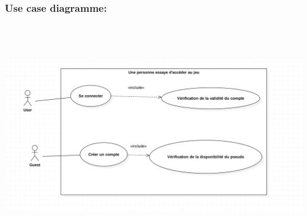 \documentclass[10pt,a4paper]{article}
\begin{document}

	
\subsubsection{Use case diagramme:}

\begin{center}
    \includegraphics[height=10cm,width=15cm]{personne_acces_jeu.png}
\end{center}
\end{document}
